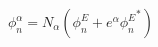 \begin{equation}
  \label{eq:free4}
  \phi^\alpha_n = N_\alpha(\phi^E_n+e^\alpha{\phi_n^E}^*)
\end{equation}

